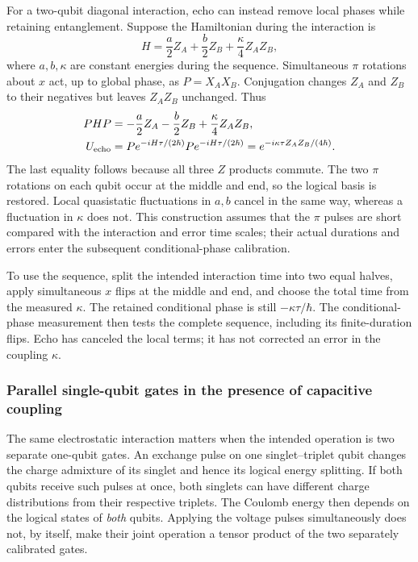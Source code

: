 For a two-qubit diagonal interaction, echo can instead remove
local phases while retaining entanglement. Suppose the Hamiltonian
during the interaction is
\[
 H=\frac{a}{2}Z_A+\frac{b}{2}Z_B+\frac{\kappa}{4}Z_AZ_B,
\]
where $a,b,\kappa$ are constant energies during the sequence.
Simultaneous $\pi$ rotations about $x$ act, up to global phase,
as $P=X_AX_B$. Conjugation changes $Z_A$ and $Z_B$ to their
negatives but leaves $Z_AZ_B$ unchanged. Thus
\begin{align}
 PHP&=-\frac{a}{2}Z_A-\frac{b}{2}Z_B
                      +\frac{\kappa}{4}Z_AZ_B,\notag\\
 U_{\mathrm{echo}}
 &=P e^{-iH\tau/(2\hbar)}P e^{-iH\tau/(2\hbar)}
   =e^{-i\kappa\tau Z_AZ_B/(4\hbar)}.
 \label{eq:calibration-echoed-entangler}
\end{align}
The last equality follows because all three $Z$ products commute.
The two $\pi$ rotations on each qubit occur at the middle and end,
so the logical basis is restored. Local quasistatic fluctuations in
$a,b$ cancel in the same way, whereas a fluctuation in $\kappa$
does not. This construction assumes that the $\pi$ pulses are
short compared with the interaction and error time scales;
their actual durations and errors enter the subsequent
conditional-phase calibration.

To use the sequence, split the intended interaction time into two
equal halves, apply simultaneous $x$ flips at the middle and end,
and choose the total time from the measured $\kappa$.
The retained conditional phase is still $-\kappa\tau/\hbar$.
The conditional-phase measurement then tests the complete sequence,
including its finite-duration flips. Echo has canceled the local
terms; it has not corrected an error in the coupling $\kappa$.

\subsubsection{Parallel single-qubit gates in the presence of capacitive coupling}
\label{sec:calibration-parallel-st-gates}

The same electrostatic interaction matters when the intended operation
is two separate one-qubit gates. An exchange pulse on one
singlet--triplet qubit changes the charge admixture of its singlet
and hence its logical energy splitting. If both qubits receive such
pulses at once, both singlets can have different charge distributions
from their respective triplets. The Coulomb energy then depends on
the logical states of \emph{both} qubits. Applying the voltage pulses
simultaneously does not, by itself, make their joint operation a
tensor product of the two separately calibrated gates.

